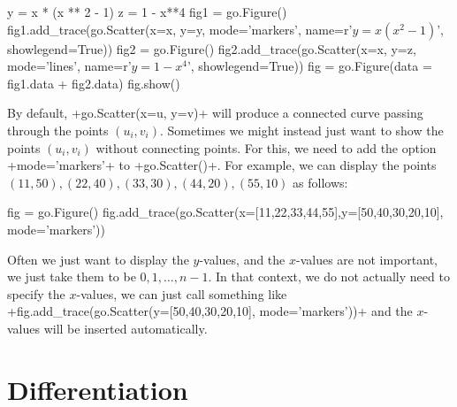 \documentclass[a4paper,10pt]{amsbook}
\begin{document}
\begin{secenum}
\begin{pcodeblock}
    y = x * (x ** 2 - 1)
    z = 1 - x**4
    fig1 = go.Figure()
    fig1.add_trace(go.Scatter(x=x, y=y, mode='markers', 
                              name=r'$y = x(x^2-1)$', 
                              showlegend=True))
    fig2 = go.Figure()
    fig2.add_trace(go.Scatter(x=x, y=z, mode='lines', 
                              name=r'$y = 1 - x^4$', 
                              showlegend=True))
    fig = go.Figure(data = fig1.data + fig2.data)
    fig.show()
  \end{pcodeblock}
%
 \item\label{listplot}
  By default, \pcode+go.Scatter(x=u, y=v)+ will produce a connected
  curve passing through the points $(u_i,v_i)$.  Sometimes we might
  instead just want to show the points $(u_i,v_i)$ without connecting
  points.  For this, we need to add the option \pcode+mode='markers'+
  to \pcode+go.Scatter()+.  For example, we can display the points 
  $(11,50),(22,40),(33,30),(44,20),(55,10)$ as follows:
  \begin{pcodeblock}
   fig = go.Figure()
   fig.add_trace(go.Scatter(x=[11,22,33,44,55],y=[50,40,30,20,10], mode='markers'))
  \end{pcodeblock}
  Often we just want to display the $y$-values, and the $x$-values are
  not important, we just take them to be $0,1,\dotsc,n-1$.  In that
  context, we do not actually need to specify the $x$-values, we can
  just call something like 
  \pcode+fig.add_trace(go.Scatter(y=[50,40,30,20,10], mode='markers'))+
  and the $x$-values will be inserted automatically.
\end{secenum}

\section{Differentiation}\label{sec-diff}
\end{document}
